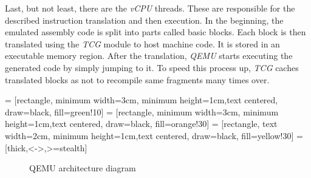 Last, but not least, there are the \textit{vCPU} threads. These are responsible for the described instruction translation and then execution. In the beginning, the emulated assembly code is split into parts called basic blocks. Each block is then translated using the \textit{TCG} module to host machine code. It is stored in an executable memory region. After the translation, \textit{QEMU} starts executing the generated code by simply jumping to it. To speed this process up, \textit{TCG} caches translated blocks as not to recompile same fragments many times over. 

 = [rectangle, minimum width=3cm, minimum height=1cm,text centered, draw=black, fill=green!10]
 = [rectangle, minimum width=3cm, minimum height=1cm,text centered, draw=black, fill=orange!30]
 = [rectangle, text width=2cm, minimum height=1cm,text centered, draw=black, fill=yellow!30]
 = [thick,<->,>=stealth]

\begin{figure}[h!]
    \centering

    
    \caption{QEMU architecture diagram}
    \label{fig:qemuarch}
\end{figure}

